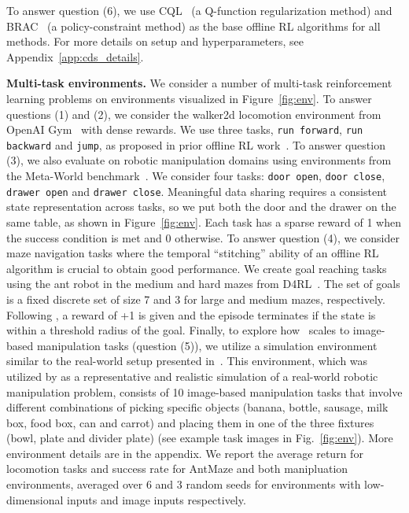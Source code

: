 To answer question (6), we use CQL~\citep{kumar2020conservative} (a Q-function regularization method) and BRAC~\citep{wu2019behavior} (a policy-constraint method) as the base offline RL algorithms for all methods.  For more details on setup and hyperparameters, see Appendix~\ref{app:cds_details}.


\textbf{Multi-task environments.} We consider a number of multi-task reinforcement learning problems on environments visualized in Figure~\ref{fig:env}. 
{To answer questions (1) and (2), we consider the walker2d locomotion environment from OpenAI Gym~\citep{brockman2016openai} with dense rewards. We use three tasks, \texttt{run forward}, \texttt{run backward} and \texttt{jump}, as proposed in prior offline RL work~\citep{yu2020mopo}.}
To answer question (3), we also evaluate on robotic manipulation domains using environments from the Meta-World benchmark~\citep{yu2020metaworld}. We consider four tasks: \texttt{door open}, \texttt{door close}, \texttt{drawer open} and \texttt{drawer close}. Meaningful data sharing requires a consistent state representation across tasks, so we put both the door and the drawer on the same table, as shown in Figure~\ref{fig:env}. Each task has a sparse reward of 1 when the success condition is met and 0 otherwise. To answer question (4), we consider maze navigation tasks where the temporal ``stitching'' ability of an offline RL algorithm is crucial to obtain good performance. We create goal reaching tasks using the ant robot in the medium and hard mazes from D4RL~\citep{fu2020d4rl}. The set of goals is a fixed discrete set of size 7 and 3 for large and medium mazes, respectively. Following \citet{fu2020d4rl}, a reward of +1 is given and the episode terminates if the state is within a threshold radius of the goal. Finally, to explore how \cdsmethodname\ scales to image-based manipulation tasks (question (5)), we utilize a simulation environment similar to the real-world setup presented in~\citep{kalashnikov2021mt}. This environment, which was utilized by \citet{kalashnikov2021mt} as a representative and realistic simulation of a real-world robotic manipulation problem, consists of 10 image-based manipulation tasks that involve different combinations of picking specific objects (banana, bottle, sausage, milk box, food box, can and carrot) and placing them in one of the three fixtures (bowl, plate and divider plate) (see example task images in Fig.~\ref{fig:env}).
More environment details are in the appendix. We report the average return for locomotion tasks and success rate for AntMaze and both manipluation environments, averaged over 6 and 3 random seeds for environments with low-dimensional inputs and image inputs respectively.

